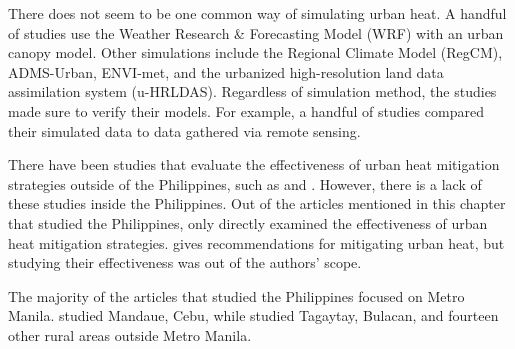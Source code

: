 	There does not seem to be one common way of simulating urban heat.
	A handful of studies use the Weather Research \& Forecasting Model (WRF) with an urban canopy model.
	Other simulations include the Regional Climate Model (RegCM),
		ADMS-Urban, 
		ENVI-met, and
		the urbanized high-resolution land data assimilation system (u-HRLDAS).
	Regardless of simulation method, the studies made sure to verify their models. For example, a handful of studies compared their simulated data to data gathered via remote sensing.
	
	There have been studies that evaluate the effectiveness of urban heat mitigation strategies outside of the Philippines, such as \textcite{Gao2019} and \textcite{Gao2020}. 
	However, there is a lack of these studies inside the Philippines.
	Out of the articles mentioned in this chapter that studied the Philippines, only \textcite{Cortes2022} directly examined the effectiveness of urban heat mitigation strategies.
	\textcite{Purio2022} gives recommendations for mitigating urban heat, but studying their effectiveness was out of the authors' scope.
	
	The majority of the articles that studied the Philippines focused on Metro Manila.
	\textcite{Cortes2022} studied Mandaue, Cebu, while \textcite{Oliveros2019} studied Tagaytay, Bulacan, and fourteen other rural areas outside Metro Manila.
	
		
